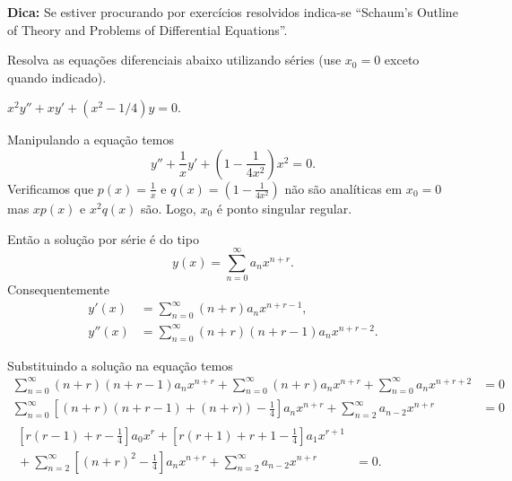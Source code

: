 \documentclass[a4paper,12pt, leqno, answers]{exam}
\begin{document}
\textbf{Dica:} Se estiver procurando por exerc\'{i}cios resolvidos indica-se ``Schaum's Outline of Theory and Problems of Differential Equations''\nocite{Bronson:1994:Schaum,Bronson:2009:Schaum}.

Resolva as equa\c{c}\~{o}es diferenciais abaixo utilizando s\'{e}ries (use $x_0 = 0$ exceto quando indicado).
\begin{questions}
    \question $x^2 y'' + x y' + \left( x^2 - 1/4 \right) y = 0$.
    \begin{solution}
        Manipulando a equa\c{c}\~{a}o temos
        \[
        y'' + \frac{1}{x} y' + \left( 1 -\frac{1}{4x^2} \right) x^2 = 0.
        \]
        Verificamos que $p\left( x \right) = \frac{1}{x}$ e $q\left( x \right) = \left( 1 - \frac{1}{4x^2} \right)$ n\~{a}o s\~{a}o anal\'{i}ticas em $x_0 = 0$ mas $x p\left( x \right)$ e $x^2 q\left( x \right)$ s\~{a}o. Logo, $x_0$ \'{e} ponto singular regular.

        Ent\~{a}o a solu\c{c}\~{a}o por s\'{e}rie \'{e} do tipo
        \[
        y\left( x \right) = \sum_{n = 0}^\infty a_n x^{n + r}.
        \]
        Consequentemente
        \begin{align*}
            y'(x) &= \sum_{n = 0}^\infty \left( n + r \right) a_n x^{n + r - 1}, \\
            y''(x) &= \sum_{n = 0}^\infty \left( n + r \right) \left( n + r - 1 \right) a_n x^{n + r - 2}.
        \end{align*}

        Substituindo a solu\c{c}\~{a}o na equa\c{c}\~{a}o temos
        \begin{align*}
            \sum_{n = 0}^\infty \left( n + r \right) \left( n + r - 1 \right) a_n x^{n + r} + \sum_{n = 0}^\infty \left( n + r \right) a_n x^{n + r} + \sum_{n = 0}^\infty a_n x^{n + r + 2} &= 0 \\
            \sum_{n = 0}^\infty \left[ \left( n + r \right) \left( n + r - 1 \right) + \left( n + r) \right) - \frac{1}{4} \right] a_n x^{n + r} + \sum_{n = 2}^\infty a_{n - 2} x^{n + r} &= 0 \\
            \begin{split}
                \left[ r \left( r - 1 \right) + r - \frac{1}{4} \right] a_0 x^r + \left[ r \left( r + 1 \right) + r + 1 - \frac{1}{4} \right] a_1 x^{r + 1} \\ {}+ \sum_{n = 2}^\infty \left[ \left( n + r \right)^2 - \frac{1}{4} \right] a_n x^{n + r} + \sum_{n = 2}^\infty a_{n - 2} x^{n + r} &= 0.
            \end{split}
        \end{align*}


\end{solution}
\end{questions}
\end{document}
